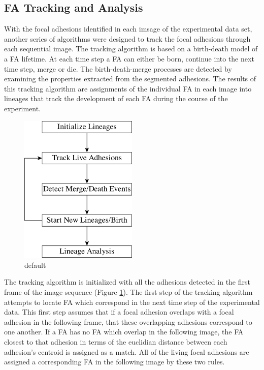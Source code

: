 \documentclass[letterpaper,twocolumn]{article}
\begin{document}
\subsection*{FA Tracking and Analysis}

With the focal adhesions identified in each imsage of the experimental data set, another series of algorithms were designed to track the focal adhesions through each sequential image. The tracking algorithm is based on a birth-death model of a FA lifetime. At each time step a FA can either be born, continue into the next time step, merge or die. The birth-death-merge processes are detected by examining the properties extracted from the segmented adhesions. The results of this tracking algorithm are assignments of the individual FA in each image into lineages that track the development of each FA during the course of the experiment.

\begin{figure}[htbp]
\begin{center}
\includegraphics[width=0.5\textwidth]{figures/tracking_chart}
\caption{default}
\label{tracking_chart}
\end{center}
\end{figure}


The tracking algorithm is initialized with all the adhesions detected in the first frame of the image sequence (Figure \ref{tracking_chart}). The first step of the tracking algorithm attempts to locate FA which correspond in the next time step of the experimental data. This first step assumes that if a focal adhesion overlaps with a focal adhesion in the following frame, that these overlapping adhesions correspond to one another. If a FA has no FA which overlap in the following image, the FA closest to that adhesion in terms of the euclidian distance between each adhesion's centroid is assigned as a match. All of the living focal adhesions are assigned a corresponding FA in the following image by these two rules.
\end{document}
